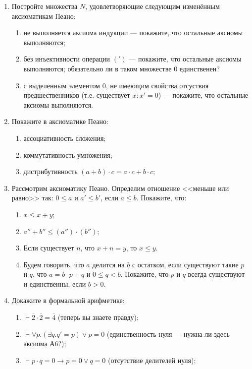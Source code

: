 \documentclass[10pt,a4paper,oneside]{article}
\begin{document}
\begin{enumerate}
\item Постройте множества $N$, удовлетворяющие следующим изменённым аксиоматикам Пеано:
\begin{enumerate}
\item не выполняется аксиома индукции --- покажите, что остальные аксиомы выполняются;
\item без инъективности операции $(')$ --- покажите, что остальные аксиомы выполняются; обязательно ли в таком множестве $0$ единственен?
\item с выделенным элементом $0$, не имеющим свойства отсуствия предшественников (т.е. существует $x: x' = 0$) --- покажите, что остальные аксиомы выполняются.
\end{enumerate}

\item Покажите в аксиоматике Пеано:
\begin{enumerate}
\item ассоциативность сложения;
\item коммутативность умножения;
\item дистрибутивность $(a + b) \cdot c = a \cdot c + b \cdot c$;
\end{enumerate}

\item Рассмотрим аксиоматику Пеано. Определим отношение <<меньше или равно>> так: $0 \le a$ и $a' \le b'$, если $a \le b$. Покажите, что:
\begin{enumerate}
\item $x \le x+y$;
\item $a'' + b'' \le (a'') \cdot (b'')$;
\item Если существует $n$, что $x + n  = y$, то $x \le y$.
\item Будем говорить, что $a$ делится на $b$ с остатком, если существуют такие $p$ и $q$, что 
$a = b \cdot p + q$ и $0 \le q < b$. Покажите, что $p$ и $q$ всегда существуют и единственны,
если $b > 0$.
\end{enumerate}

\item Докажите в формальной арифметике:
\begin{enumerate}
\item $\vdash \overline{2} \cdot \overline{2} = \overline{4}$ (теперь вы знаете правду);
\item $\vdash \forall p.(\exists q.q' = p) \vee p = 0$ (единственность нуля --- нужна ли здесь аксиома А6?);
\item $\vdash p \cdot q = 0 \rightarrow p = 0 \vee q = 0$ (отсутствие делителей нуля);
\end{enumerate}


\end{enumerate}
\end{document}
